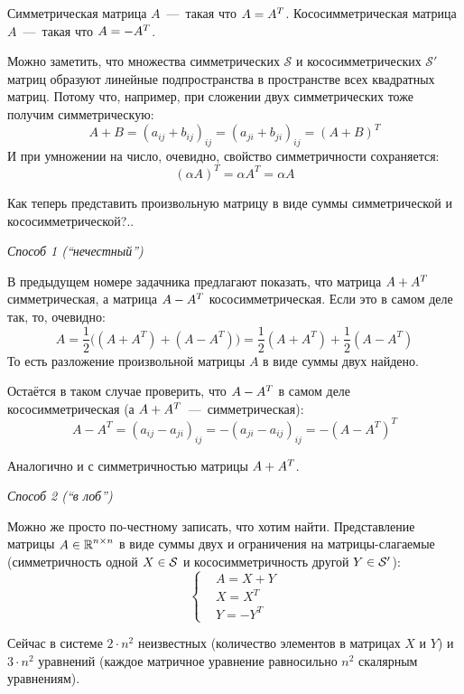 \documentclass[a4paper,12pt]{article}
\begin{document}
  \begin{solution}
    Симметрическая матрица $A$~---~такая что $A \hm= A^T$.
    Кососимметрическая матрица $A$~---~такая что $A \hm= -A^T$.
    
    Можно заметить, что множества симметрических $\mathcal S$ и кососимметрических $\mathcal S'$ матриц образуют линейные подпространства в пространстве всех квадратных матриц.
    Потому что, например, при сложении двух симметрических тоже получим симметрическую:
    \[
      A + B = (a_{ij} + b_{ij})_{ij} = (a_{ji} + b_{ji})_{ij} = (A + B)^T
    \]
    И при умножении на число, очевидно, свойство симметричности сохраняется:
    \[
      (\alpha A)^T = \alpha A^T = \alpha A
    \]
    
    Как теперь представить произвольную матрицу в виде суммы симметрической и кососимметрической?..
    
    \bigskip
    
    \emph{Способ 1 (``нечестный'')}
    
    В предыдущем номере задачника предлагают показать, что матрица $A \hm+ A^T$ симметрическая, а матрица $A \hm- A^T$ кососимметрическая.
    Если это в самом деле так, то, очевидно:
    \[
      A = \frac{1}{2} \bigl((A + A^T) + (A - A^T)\bigr) = \frac{1}{2} (A + A^T) + \frac{1}{2} (A - A^T)
    \]
    То есть разложение произвольной матрицы $A$ в виде суммы двух найдено.
    
    Остаётся в таком случае проверить, что $A \hm- A^T$ в самом деле кососимметрическая (а $A \hm+ A^T$~---~симметрическая):
    \[
      A - A^T = (a_{ij} - a_{ji})_{ij} = -(a_{ji} - a_{ij})_{ij} = -(A - A^T)^T
    \]
    
    Аналогично и с симметричностью матрицы $A \hm+ A^T$.
    
    \bigskip
    
    \emph{Способ 2 (``в лоб'')}
    
    Можно же просто по-честному записать, что хотим найти.
    Представление матрицы $A \hm\in \RR^{n\times n}$ в виде суммы двух и ограничения на матрицы-слагаемые (симметричность одной $X \hm\in \mathcal S$ и кососимметричность другой $Y \hm\in \mathcal S'$):
    \[
      \left\{
        \begin{aligned}
          &A = X + Y\\
          &X = X^T\\
          &Y = -Y^T
        \end{aligned}
      \right.
    \]
    
    Сейчас в системе $2 \cdot n^2$ неизвестных (количество элементов в матрицах $X$ и $Y$) и $3 \cdot n^2$ уравнений (каждое матричное уравнение равносильно $n^2$ скалярным уравнениям).
    

\end{solution}
\end{document}
